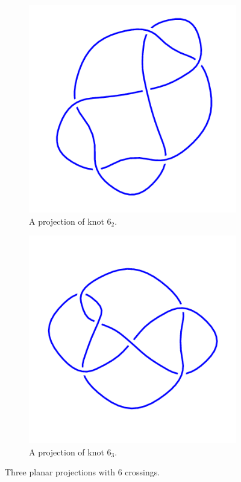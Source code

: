 \documentclass[12pt,letterpaper]{article}
\theoremstyle{definition}
\begin{document}
\begin{figure}[h]
\begin{subfigure}{.3\textwidth}
        \includegraphics[width=\textwidth]{knotpics/6_2.png}
        \caption{A projection of knot $6_2$.}
    \end{subfigure}
    \quad
    \begin{subfigure}{.3\textwidth}
        \centering
        \includegraphics[width=\textwidth]{knotpics/6_3.png}
        \caption{A projection of knot $6_3$.}
    \end{subfigure}
\caption{Three planar projections with 6 crossings.}
\end{figure}
\end{document}

